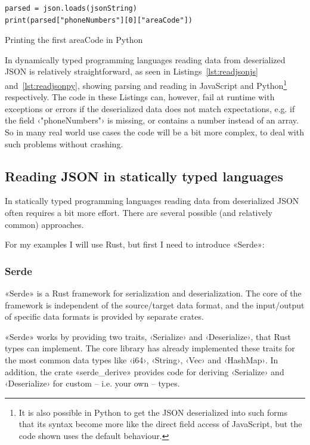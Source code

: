 \begin{listing}[ht!]
\begin{verbatim}
parsed = json.loads(jsonString)
print(parsed["phoneNumbers"][0]["areaCode"])
\end{verbatim}
\caption{Printing the first areaCode in Python}
\label{lst:readjsonpy}
\end{listing}

In dynamically typed programming languages reading data from deserialized JSON is relatively straightforward, as seen in Listings~\ref{lst:readjsonjs} and~\ref{lst:readjsonpy}, showing parsing and reading in JavaScript and Python\footnote{It is also possible in Python to get the JSON deserialized into such forms that its syntax become more like the direct field access of JavaScript, but the code shown uses the default behaviour.} respectively. The code in these Listings can, however, fail at runtime with exceptions or errors if the deserialized data does not match expectations, e.g. if the field ‹"phoneNumbers"› is missing, or contains a number instead of an array. So in many real world use cases the code will be a bit more complex, to deal with such problems without crashing.

\subsection{Reading JSON in statically typed languages}

In statically typed programming languages reading data from deserialized JSON often requires a bit more effort. There are several possible (and relatively common) approaches.

For my examples I will use Rust, but first I need to introduce «Serde»:

\subsubsection{Serde}
\label{sec:serde}

«Serde»\cite{serde} is a Rust framework for serialization and deserialization. The core of the framework is independent of the source/target data format, and the input/output of specific data formats is provided by separate crates.

«Serde» works by providing two traits, ‹Serialize› and ‹Deserialize›, that Rust types can implement. The core library has already implemented these traits for the most common data types like ‹i64›, ‹String›, ‹Vec› and ‹HashMap›. In addition, the crate «serde_derive» provides code for deriving ‹Serialize› and ‹Deserialize› for custom -- i.e. your own -- types.

